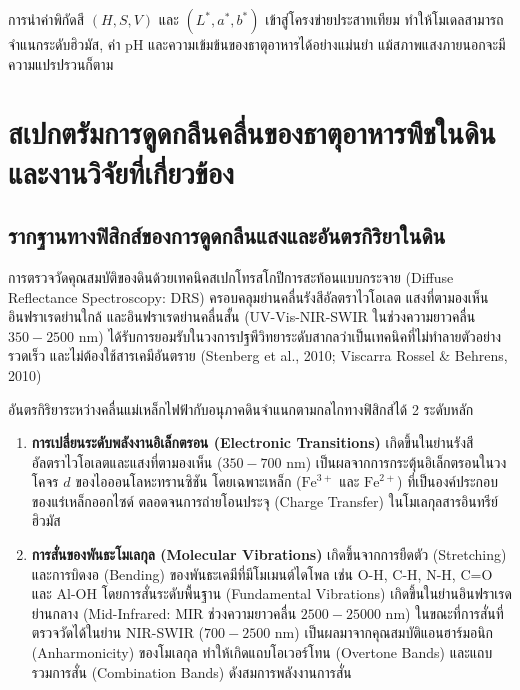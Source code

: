 \documentclass[12pt,a4paper,oneside]{book}
\begin{document}
การนำค่าพิกัดสี $(H, S, V)$ และ $(L^*, a^*, b^*)$ เข้าสู่โครงข่ายประสาทเทียม ทำให้โมเดลสามารถจำแนกระดับฮิวมัส, ค่า pH และความเข้มข้นของธาตุอาหารได้อย่างแม่นยำ แม้สภาพแสงภายนอกจะมีความแปรปรวนก็ตาม

\chapter[สเปกตรัมการดูดกลืนคลื่นของธาตุอาหารพืชในดิน]{สเปกตรัมการดูดกลืนคลื่นของธาตุอาหารพืชในดินและงานวิจัยที่เกี่ยวข้อง}

\section{รากฐานทางฟิสิกส์ของการดูดกลืนแสงและอันตรกิริยาในดิน}
การตรวจวัดคุณสมบัติของดินด้วยเทคนิคสเปกโทรสโกปีการสะท้อนแบบกระจาย (Diffuse Reflectance Spectroscopy: DRS) ครอบคลุมย่านคลื่นรังสีอัลตราไวโอเลต แสงที่ตามองเห็น อินฟราเรดย่านใกล้ และอินฟราเรดย่านคลื่นสั้น (UV-Vis-NIR-SWIR ในช่วงความยาวคลื่น $350 - 2500\text{ nm}$) ได้รับการยอมรับในวงการปฐพีวิทยาระดับสากลว่าเป็นเทคนิคที่ไม่ทำลายตัวอย่าง รวดเร็ว และไม่ต้องใช้สารเคมีอันตราย (Stenberg et al., 2010; Viscarra Rossel \& Behrens, 2010)

อันตรกิริยาระหว่างคลื่นแม่เหล็กไฟฟ้ากับอนุภาคดินจำแนกตามกลไกทางฟิสิกส์ได้ 2 ระดับหลัก

\begin{enumerate}
    \item \textbf{การเปลี่ยนระดับพลังงานอิเล็กตรอน (Electronic Transitions)} เกิดขึ้นในย่านรังสีอัลตราไวโอเลตและแสงที่ตามองเห็น ($350 - 700\text{ nm}$) เป็นผลจากการกระตุ้นอิเล็กตรอนในวงโคจร $d$ ของไอออนโลหะทรานซิชัน โดยเฉพาะเหล็ก ($\text{Fe}^{3+}$ และ $\text{Fe}^{2+}$) ที่เป็นองค์ประกอบของแร่เหล็กออกไซด์ ตลอดจนการถ่ายโอนประจุ (Charge Transfer) ในโมเลกุลสารอินทรีย์ฮิวมัส
    
    \item \textbf{การสั่นของพันธะโมเลกุล (Molecular Vibrations)} เกิดขึ้นจากการยืดตัว (Stretching) และการบิดงอ (Bending) ของพันธะเคมีที่มีโมเมนต์ไดโพล เช่น $\text{O-H}$, $\text{C-H}$, $\text{N-H}$, $\text{C=O}$ และ $\text{Al-OH}$ โดยการสั่นระดับพื้นฐาน (Fundamental Vibrations) เกิดขึ้นในย่านอินฟราเรดย่านกลาง (Mid-Infrared: MIR ช่วงความยาวคลื่น $2500 - 25000\text{ nm}$) ในขณะที่การสั่นที่ตรวจวัดได้ในย่าน NIR-SWIR ($700 - 2500\text{ nm}$) เป็นผลมาจากคุณสมบัติแอนฮาร์มอนิก (Anharmonicity) ของโมเลกุล ทำให้เกิดแถบโอเวอร์โทน (Overtone Bands) และแถบรวมการสั่น (Combination Bands) ดังสมการพลังงานการสั่น
\end{enumerate}
\end{document}
